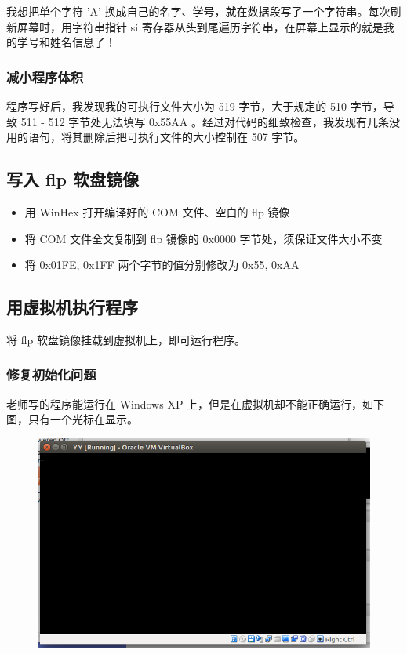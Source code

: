 \documentclass{article}
\begin{document}
我想把单个字符 'A' 换成自己的名字、学号，就在数据段写了一个字符串。每次刷新屏幕时，用字符串指针 si 寄存器从头到尾遍历字符串，在屏幕上显示的就是我的学号和姓名信息了！

\subsubsection{减小程序体积}

程序写好后，我发现我的可执行文件大小为 519 字节，大于规定的 510 字节，导致 511 - 512 字节处无法填写 0x55AA 。经过对代码的细致检查，我发现有几条没用的语句，将其删除后把可执行文件的大小控制在 507 字节。

\subsection{写入 flp 软盘镜像}

\begin{itemize}
\item 用 WinHex 打开编译好的 COM 文件、空白的 flp 镜像
\item 将 COM 文件全文复制到 flp 镜像的 0x0000 字节处，须保证文件大小不变
\item 将 0x01FE, 0x1FF 两个字节的值分别修改为 0x55, 0xAA
\end{itemize}

\subsection{用虚拟机执行程序}

将 flp 软盘镜像挂载到虚拟机上，即可运行程序。

\subsubsection{修复初始化问题}

老师写的程序能运行在 Windows XP 上，但是在虚拟机却不能正确运行，如下图，只有一个光标在显示。

\begin{figure}[!hbp]
	\centering
	\includegraphics[scale=0.6]{pics/4.png}
\end{figure}
\end{document}
